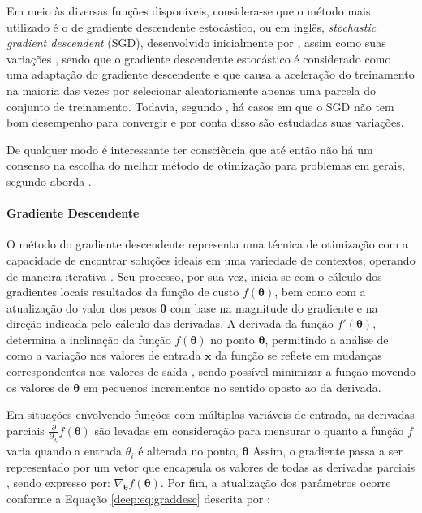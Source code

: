 Em meio às diversas funções disponíveis, considera-se que o método mais utilizado é o de gradiente descendente estocástico, ou em inglês, \textit{stochastic gradient descendent} (SGD), desenvolvido inicialmente por \cite{cauchy1847methode}, assim como suas variações \citep{Goodfellow2016}, sendo que o gradiente descendente estocástico é considerado como uma adaptação do gradiente descendente e que causa a aceleração do treinamento na maioria das vezes por selecionar aleatoriamente apenas uma parcela do conjunto de treinamento. Todavia, segundo \cite{Goodfellow2016}, há casos em que o SGD não tem bom desempenho para convergir e por conta disso são estudadas suas variações.

De qualquer modo é interessante ter consciência que até então não há um consenso na escolha do melhor método de otimização para problemas em gerais, segundo aborda \cite{Goodfellow2016}.


\paragraph{Gradiente Descendente}
\label{deep:optimization:graddesc}
O método do gradiente descendente representa uma técnica de otimização com a capacidade de encontrar soluções ideais em uma variedade de contextos, operando de maneira iterativa \citep{Geron2017Hands-onSystems}. Seu processo, por sua vez, inicia-se com o cálculo dos gradientes locais resultados da função de custo $f(\boldsymbol{\theta})$, bem como com a atualização do valor dos pesos $\boldsymbol{\theta}$ com base na magnitude do gradiente e na direção indicada pelo cálculo das derivadas. A derivada da função $f'(\boldsymbol{\theta})$, determina a inclinação da função $f(\boldsymbol{\theta})$ no ponto $\boldsymbol{\theta}$, permitindo a análise de como a variação nos valores de entrada $\boldsymbol{x}$ da função se reflete em mudanças correspondentes nos valores de saída \citep{Goodfellow2016}, sendo possível minimizar a função movendo os valores de $\boldsymbol{\theta}$ em pequenos incrementos no sentido oposto ao da derivada.

Em situações envolvendo funções com múltiplas variáveis de entrada, as derivadas parciais $\frac{\partial}{\partial_{\theta_{i}}}f(\boldsymbol{\theta})$ são levadas em consideração para mensurar o quanto a função $f$ varia quando a entrada $\theta_i$ é alterada no ponto, $\boldsymbol{\theta}$ Assim, o gradiente passa a ser representado por um vetor que encapsula os valores de todas as derivadas parciais \citep{Goodfellow2016}, sendo expresso por: $\nabla_{\boldsymbol{\theta}} f(\boldsymbol{\theta})$.  Por fim, a atualização dos parâmetros ocorre conforme a Equação \ref{deep:eq:graddesc} descrita por \cite{Goodfellow2016}:

